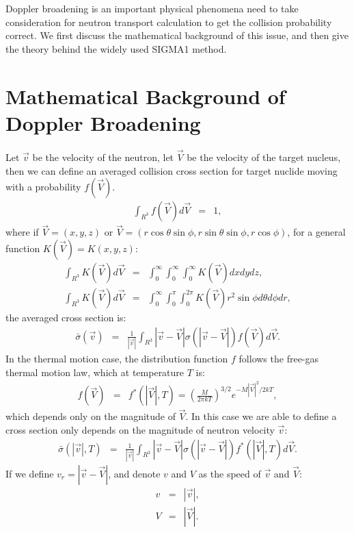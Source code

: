 Doppler broadening is an important physical phenomena need to take consideration for neutron transport calculation to get the collision probability correct. We first discuss the mathematical background of this issue, and then give the theory behind the widely used SIGMA1 method.
\section{Mathematical Background of Doppler Broadening}
Let $\vec{v}$ be the velocity of the neutron, let $\vec{V}$ be the velocity of the target nucleus, then we can define an averaged collision cross section for target nuclide moving with a probability $f(\vec{V})$.
\begin{eqnarray}
\int_{R^3}f(\vec{V})d\vec{V}&=&1,
\end{eqnarray}
\noindent where if $\vec{V}=(x,y,z)$ or $\vec{V}=(r\cos\theta\sin\phi,r\sin\theta\sin\phi,r\cos\phi)$, for a general function $K(\vec{V})=K(x,y,z)$:
\begin{eqnarray}
\int_{R^3}K(\vec{V})d\vec{V}&=&\int_{0}^\infty\int_{0}^\infty\int_{0}^\infty K(\vec{V})dxdydz,\\
\int_{R^3}K(\vec{V})d\vec{V}&=&\int_{0}^\infty\int_{0}^{\pi}\int_{0}^{2\pi} K(\vec{V}) r^2\sin\phi d\theta d\phi dr,
\end{eqnarray}
\noindent the averaged cross section is:
\begin{eqnarray}
\bar{\sigma}(\vec{v})&=&\frac{1}{|\vec{v}|}\int_{R^3}|\vec{v}-\vec{V}|\sigma(|\vec{v}-\vec{V}|)f(\vec{V})d\vec{V}.
\end{eqnarray}
\noindent In the thermal motion case, the distribution function $f$ follows the free-gas thermal motion law, which at temperature $T$ is:
\begin{eqnarray}
f(\vec{V})&=&f^{*}(|\vec{V}|, T)=(\frac{M}{2\pi k T})^{3/2}e^{-M|\vec{V}|^2/2kT},
\end{eqnarray}
\noindent which depends only on the magnitude of $\vec{V}$. In this case we are able to define a cross section only depends on the magnitude of neutron velocity $\vec{v}$:
\begin{eqnarray}
\bar{\sigma}(|\vec{v}|,T)&=&\frac{1}{|\vec{v}|}\int_{R^3}|\vec{v}-\vec{V}|\sigma(|\vec{v}-\vec{V}|)f^{*}(|\vec{V}|, T)d\vec{V}.
\end{eqnarray}
\noindent If we define $v_r=|\vec{v}-\vec{V}|$, and denote $v$ and $V$ as the speed of $\vec{v}$ and $\vec{V}$:
\begin{eqnarray}
v&=&|\vec{v}|,\\
V&=&|\vec{V}|.
\end{eqnarray}
